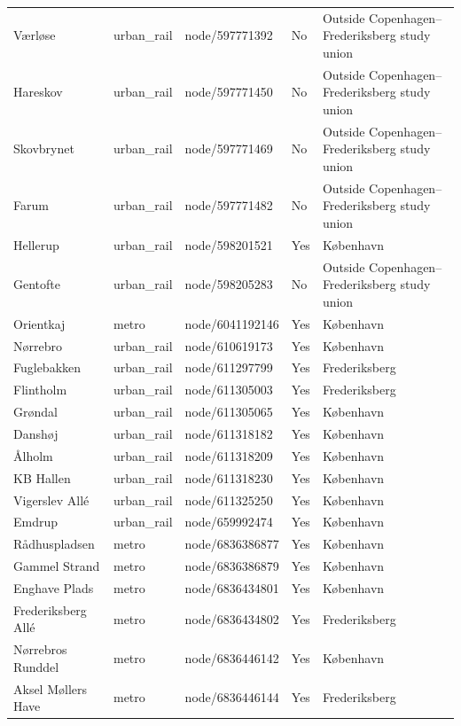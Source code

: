 \begin{landscape}
\begin{longtable}{>{\raggedright\arraybackslash}p{8.0cm}>{\raggedright\arraybackslash}p{2.4cm}>{\raggedright\arraybackslash}p{3.7cm}>{\raggedright\arraybackslash}p{1.5cm}>{\raggedright\arraybackslash}p{5.2cm}}
Værløse & urban\_\allowbreak{}rail & node/597771392 & No & Outside Copenhagen--Frederiksberg study union \\
Hareskov & urban\_\allowbreak{}rail & node/597771450 & No & Outside Copenhagen--Frederiksberg study union \\
Skovbrynet & urban\_\allowbreak{}rail & node/597771469 & No & Outside Copenhagen--Frederiksberg study union \\
Farum & urban\_\allowbreak{}rail & node/597771482 & No & Outside Copenhagen--Frederiksberg study union \\
Hellerup & urban\_\allowbreak{}rail & node/598201521 & Yes & København \\
Gentofte & urban\_\allowbreak{}rail & node/598205283 & No & Outside Copenhagen--Frederiksberg study union \\
Orientkaj & metro & node/6041192146 & Yes & København \\
Nørrebro & urban\_\allowbreak{}rail & node/610619173 & Yes & København \\
Fuglebakken & urban\_\allowbreak{}rail & node/611297799 & Yes & Frederiksberg \\
Flintholm & urban\_\allowbreak{}rail & node/611305003 & Yes & Frederiksberg \\
Grøndal & urban\_\allowbreak{}rail & node/611305065 & Yes & København \\
Danshøj & urban\_\allowbreak{}rail & node/611318182 & Yes & København \\
Ålholm & urban\_\allowbreak{}rail & node/611318209 & Yes & København \\
KB Hallen & urban\_\allowbreak{}rail & node/611318230 & Yes & København \\
Vigerslev Allé & urban\_\allowbreak{}rail & node/611325250 & Yes & København \\
Emdrup & urban\_\allowbreak{}rail & node/659992474 & Yes & København \\
Rådhuspladsen & metro & node/6836386877 & Yes & København \\
Gammel Strand & metro & node/6836386879 & Yes & København \\
Enghave Plads & metro & node/6836434801 & Yes & København \\
Frederiksberg Allé & metro & node/6836434802 & Yes & Frederiksberg \\
Nørrebros Runddel & metro & node/6836446142 & Yes & København \\
Aksel Møllers Have & metro & node/6836446144 & Yes & Frederiksberg \\

\end{longtable}
\end{landscape}
